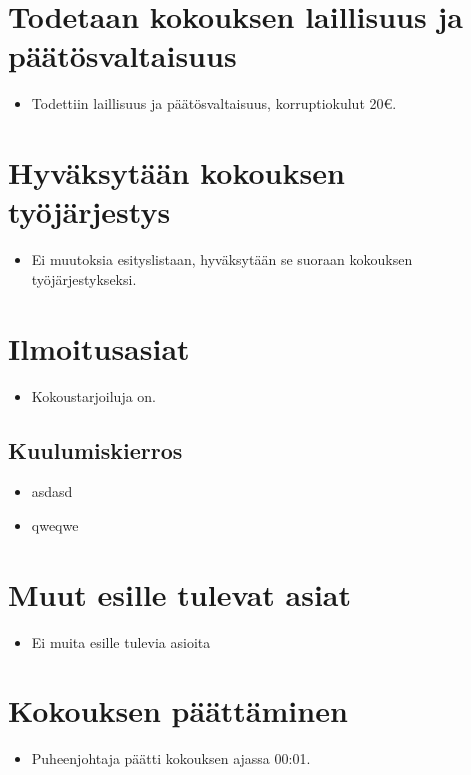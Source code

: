 \documentclass[finnish,12pt,a4paper]{article}
\newcommand{\loppuu}{00:01}
\begin{document}
\section{Todetaan kokouksen laillisuus ja päätösvaltaisuus}
\begin{itemize}
    \item Todettiin laillisuus ja päätösvaltaisuus, korruptiokulut 20\euro{}.
\end{itemize}

\section{Hyväksytään kokouksen työjärjestys}
\begin{itemize}
    \item Ei muutoksia esityslistaan, hyväksytään se suoraan kokouksen työjärjestykseksi.
\end{itemize}

\section{Ilmoitusasiat}
\begin{itemize}
    \item Kokoustarjoiluja on.
\end{itemize}
\subsection{Kuulumiskierros}
\begin{itemize}
    \item asdasd
    \item qweqwe
\end{itemize}

\section{Muut esille tulevat asiat}
\begin{itemize}
    \item Ei muita esille tulevia asioita
\end{itemize}
\section{Kokouksen päättäminen}
\begin{itemize}
    \item Puheenjohtaja päätti kokouksen ajassa \loppuu{}. 
\end{itemize}
\end{document}
